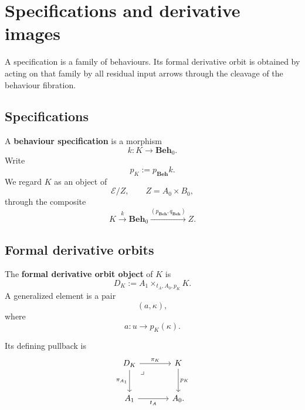 \section{Specifications and derivative images}
\label{sec:specifications-and-derivative-images}

A specification is a family of behaviours. Its formal derivative orbit is obtained by acting on that family by all residual input arrows through the cleavage of the behaviour fibration.

\subsection{Specifications}
\label{subsec:specifications}

\begin{definition}
\label{def:behaviour-specification}
    A \textbf{behaviour specification} is a morphism
    \[
        k:K\to\mathbf{Beh}_0.
    \]
    Write
    \[
        p_K:=p_{\mathbf{Beh}}k.
    \]
    We regard \(K\) as an object of
    \[
        \mathcal E/Z,
        \qquad
        Z=A_0\times B_0,
    \]
    through the composite
    \[
        K
            \xrightarrow{k}
        \mathbf{Beh}_0
            \xrightarrow{(p_{\mathbf{Beh}},q_{\mathbf{Beh}})}
        Z.
    \]
\end{definition}

\subsection{Formal derivative orbits}
\label{subsec:formal-derivative-orbits}

\begin{definition}
\label{def:formal-derivative-orbit}
    The \textbf{formal derivative orbit object} of \(K\) is
    \[
        D_K:=A_1\times_{t_A,A_0,p_K}K.
    \]
    A generalized element is a pair
    \[
        (a,\kappa),
    \]
    where
    \[
        a:u\to p_K(\kappa).
    \]
\end{definition}

Its defining pullback is
\[
    \begin{tikzcd}[column sep=large, row sep=large]
            D_K
                \arrow[r, "\pi_K"]
                \arrow[d, "\pi_{A_1}"']
                \arrow[dr, phantom, "\lrcorner", very near start]
        &
            K
                \arrow[d, "p_K"]
        \\
            A_1
                \arrow[r, "t_A"']
        &
            A_0.
    \end{tikzcd}
\]

